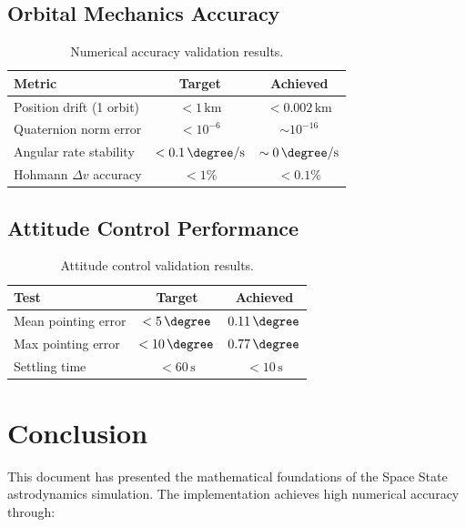 \documentclass[11pt,a4paper]{article}
\newcommand{\SI}[2]{#1\,\mathrm{#2}}
\begin{document}
\subsection{Orbital Mechanics Accuracy}

\begin{table}[h]
\centering
\begin{tabular}{lcc}
\toprule
\textbf{Metric} & \textbf{Target} & \textbf{Achieved} \\
\midrule
Position drift (1 orbit) & $< \SI{1}{km}$ & $< \SI{0.002}{km}$ \\
Quaternion norm error & $< 10^{-6}$ & $\sim 10^{-16}$ \\
Angular rate stability & $< \SI{0.1}{\degree/s}$ & $\sim \SI{0}{\degree/s}$ \\
Hohmann $\Delta v$ accuracy & $< 1\%$ & $< 0.1\%$ \\
\bottomrule
\end{tabular}
\caption{Numerical accuracy validation results.}
\end{table}

\subsection{Attitude Control Performance}

\begin{table}[h]
\centering
\begin{tabular}{lcc}
\toprule
\textbf{Test} & \textbf{Target} & \textbf{Achieved} \\
\midrule
Mean pointing error & $< \SI{5}{\degree}$ & $\SI{0.11}{\degree}$ \\
Max pointing error & $< \SI{10}{\degree}$ & $\SI{0.77}{\degree}$ \\
Settling time & $< \SI{60}{s}$ & $< \SI{10}{s}$ \\
\bottomrule
\end{tabular}
\caption{Attitude control validation results.}
\end{table}

\section{Conclusion}

This document has presented the mathematical foundations of the Space State astrodynamics simulation. The implementation achieves high numerical accuracy through:
\end{document}
